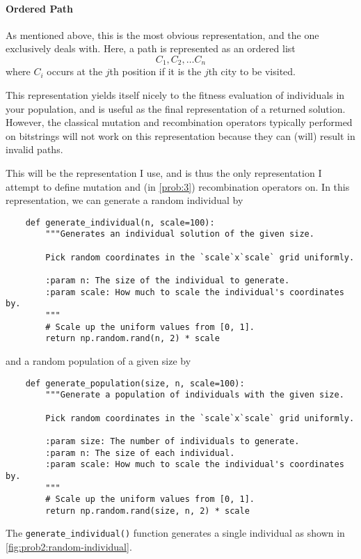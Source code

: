 \documentclass{article}
\begin{document}
\paragraph{Ordered Path}
As mentioned above, this is the most obvious representation, and the one~\cite{tsp_ea} exclusively
deals with. Here, a path is represented as an ordered list
\[C_1, C_2, \dots C_n \]
where $C_i$ occurs at the $j$th position if it is the $j$th city to be visited.

This representation yields itself nicely to the fitness evaluation of individuals in your
population, and is useful as the final representation of a returned solution. However, the
classical mutation and recombination operators typically performed on bitstrings will not work on
this representation because they can (will) result in invalid paths.

This will be the representation I use, and is thus the only representation I attempt to define
mutation and (in \autoref{prob:3}) recombination operators on. In this representation, we can
generate a random individual by

\begin{verbatim}
    def generate_individual(n, scale=100):
        """Generates an individual solution of the given size.

        Pick random coordinates in the `scale`x`scale` grid uniformly.

        :param n: The size of the individual to generate.
        :param scale: How much to scale the individual's coordinates by.
        """
        # Scale up the uniform values from [0, 1].
        return np.random.rand(n, 2) * scale
\end{verbatim}

and a random population of a given size by

\begin{verbatim}
    def generate_population(size, n, scale=100):
        """Generate a population of individuals with the given size.

        Pick random coordinates in the `scale`x`scale` grid uniformly.

        :param size: The number of individuals to generate.
        :param n: The size of each individual.
        :param scale: How much to scale the individual's coordinates by.
        """
        # Scale up the uniform values from [0, 1].
        return np.random.rand(size, n, 2) * scale
\end{verbatim}

The \texttt{generate_individual()} function generates a single individual as shown in
\autoref{fig:prob2:random-individual}.
\end{document}
